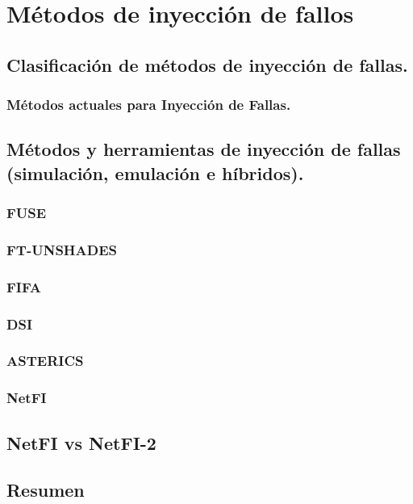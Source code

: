 \chapter{Métodos de inyección de fallos}
    

    \section{Clasificación de métodos de inyección de fallas.}
    
        \subsection{Métodos actuales para Inyección de Fallas.}
        
    \section{Métodos y herramientas de inyección de fallas (simulación, emulación e híbridos).}
    
        \subsection{FUSE}
        
        \subsection{FT-UNSHADES}
        
        \subsection{FIFA}
        
        \subsection{DSI}
        
        \subsection{ASTERICS}
        
        \subsection{NetFI}
        

\section{NetFI vs NetFI-2}


\section{Resumen}
